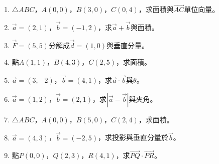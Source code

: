 \begin{enumerate}[label=\arabic*.]
    \item $\triangle ABC$，$A(0, 0)$，$B(3, 0)$，$C(0, 4)$，求面積與$\vec{AC}$單位向量。
    \item $\vec{a} = (2, 1)$，$\vec{b} = (-1, 2)$，求$\vec{a} + \vec{b}$與面積。
    \item $\vec{F} = (5, 5)$分解成$\vec{d} = (1, 0)$與垂直分量。
    \item 點$A(1, 1)$，$B(4, 3)$，$C(2, 5)$，求面積。
    \item $\vec{a} = (3, -2)$，$\vec{b} = (4, 1)$，求$\vec{a} \cdot \vec{b}$與$\theta$。
    \item $\vec{a} = (1, 2)$，$\vec{b} = (2, 1)$，求$|\vec{a} - \vec{b}|$與夾角。
    \item $\triangle ABC$，$A(0, 0)$，$B(5, 0)$，$C(2, 4)$，求面積。
    \item $\vec{a} = (4, 3)$，$\vec{b} = (-2, 5)$，求投影與垂直分量於$\vec{b}$。
    \item 點$P(0, 0)$，$Q(2, 3)$，$R(4, 1)$，求$\vec{PQ} \cdot \vec{PR}$。
\end{enumerate}